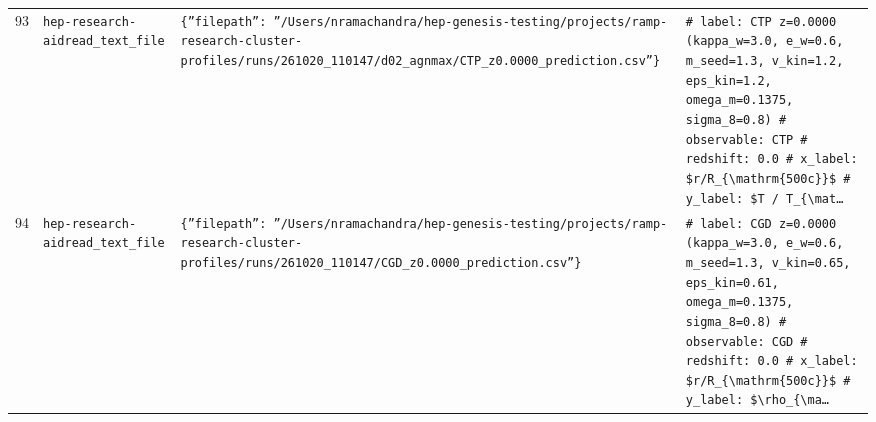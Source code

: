 \documentclass[11pt,a4paper]{article}
\begin{document}
\begin{longtable}{@{}p{}p{}p{}p{}@{}}
93 & \texttt{hep-research-aid}\newline\texttt{read\_\allowbreak{}text\_\allowbreak{}file} & \texttt{\{''filepath'':\allowbreak{} ''/\allowbreak{}Users/\allowbreak{}nramachandra/\allowbreak{}hep-genesis-testing/\allowbreak{}projects/\allowbreak{}ramp-research-cluster-profiles/\allowbreak{}runs/\allowbreak{}261020\_\allowbreak{}110147/\allowbreak{}d02\_\allowbreak{}agnmax/\allowbreak{}CTP\_\allowbreak{}z0.0000\_\allowbreak{}prediction.csv''\}\allowbreak{}} & \texttt{\# label:\allowbreak{} CTP z=\allowbreak{}0.0000 (kappa\_\allowbreak{}w=\allowbreak{}3.0,\allowbreak{} e\_\allowbreak{}w=\allowbreak{}0.6,\allowbreak{} m\_\allowbreak{}seed=\allowbreak{}1.3,\allowbreak{} v\_\allowbreak{}kin=\allowbreak{}1.2,\allowbreak{} eps\_\allowbreak{}kin=\allowbreak{}1.2,\allowbreak{} omega\_\allowbreak{}m=\allowbreak{}0.1375,\allowbreak{} sigma\_\allowbreak{}8=\allowbreak{}0.8)\allowbreak{} \# observable:\allowbreak{} CTP \# redshift:\allowbreak{} 0.0 \# x\_\allowbreak{}label:\allowbreak{} \$r/\allowbreak{}R\_\allowbreak{}\{\textbackslash{}\allowbreak{}mathrm\{500c\}\allowbreak{}\}\allowbreak{}\$ \# y\_\allowbreak{}label:\allowbreak{} \$T /\allowbreak{} T\_\allowbreak{}\{\textbackslash{}\allowbreak{}mat\ldots{}\allowbreak{}} \\
94 & \texttt{hep-research-aid}\newline\texttt{read\_\allowbreak{}text\_\allowbreak{}file} & \texttt{\{''filepath'':\allowbreak{} ''/\allowbreak{}Users/\allowbreak{}nramachandra/\allowbreak{}hep-genesis-testing/\allowbreak{}projects/\allowbreak{}ramp-research-cluster-profiles/\allowbreak{}runs/\allowbreak{}261020\_\allowbreak{}110147/\allowbreak{}CGD\_\allowbreak{}z0.0000\_\allowbreak{}prediction.csv''\}\allowbreak{}} & \texttt{\# label:\allowbreak{} CGD z=\allowbreak{}0.0000 (kappa\_\allowbreak{}w=\allowbreak{}3.0,\allowbreak{} e\_\allowbreak{}w=\allowbreak{}0.6,\allowbreak{} m\_\allowbreak{}seed=\allowbreak{}1.3,\allowbreak{} v\_\allowbreak{}kin=\allowbreak{}0.65,\allowbreak{} eps\_\allowbreak{}kin=\allowbreak{}0.61,\allowbreak{} omega\_\allowbreak{}m=\allowbreak{}0.1375,\allowbreak{} sigma\_\allowbreak{}8=\allowbreak{}0.8)\allowbreak{} \# observable:\allowbreak{} CGD \# redshift:\allowbreak{} 0.0 \# x\_\allowbreak{}label:\allowbreak{} \$r/\allowbreak{}R\_\allowbreak{}\{\textbackslash{}\allowbreak{}mathrm\{500c\}\allowbreak{}\}\allowbreak{}\$ \# y\_\allowbreak{}label:\allowbreak{} \$\textbackslash{}\allowbreak{}rho\_\allowbreak{}\{\textbackslash{}\allowbreak{}ma\ldots{}\allowbreak{}} \\

\end{longtable}
\end{document}
